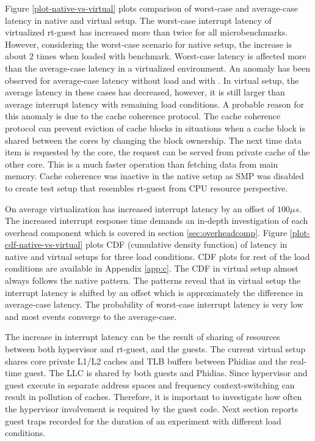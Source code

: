 


Figure \ref{plot-native-vs-virtual} plots comparison of worst-case and average-case latency in native and virtual setup.
The worst-case interrupt latency of virtualized rt-guest has increased more than twice for all microbenchmarks.
However, considering the worst-case scenario for native setup, the increase is about $2$ times when loaded with \mcachepressure{} benchmark.
Worst-case latency is affected more than the average-case latency in a virtualized environment.
An anomaly has been observed for average-case latency without load and with \mcachepressure{}. 
In virtual setup, the average latency in these cases has decreased, however, it is still larger than average interrupt latency with remaining load conditions.
A probable reason for this anomaly is due to the cache coherence protocol. 
The cache coherence protocol can prevent eviction of cache blocks in situations when a cache block is shared between the cores by changing the block ownership. The next time data item is requested by the core, the request can be served from private cache of the other core. This is a much faster operation than fetching data from main memory. Cache coherence was inactive in the native setup as SMP was disabled to create test setup that resembles rt-guest from CPU resource perspective.

On average virtualization has increased interrupt latency by an offset of $100\mu{}s$.
The increased interrupt response time demands an in-depth investigation of each overhead component which is covered in section \ref{sec:overheadcomp}.
Figure \ref{plot-cdf-native-vs-virtual} plots CDF (cumulative density function) of latency in native and virtual setups for three load conditions.
CDF plots for rest of the load conditions are available in Appendix \ref{app:c}.
The CDF in virtual setup almost always follows the native pattern.
The patterns reveal that in virtual setup the interrupt latency is shifted by an offset which is approximately the difference in average-case latency.
The probability of worst-case interrupt latency is very low and most events converge to the average-case.


The increase in interrupt latency can be the result of sharing of resources between both hypervisor and rt-guest, and the guests.
The current virtual setup shares core private L1/L2 caches and TLB buffers between Phidias and the real-time guest. 
The LLC is shared by both guests and Phidias.
Since hypervisor and guest execute in separate address spaces and frequency context-switching can result in pollution of caches.
Therefore, it is important to investigate how often the hypervisor involvement is required by the guest code.
Next section reports guest traps recorded for the duration of an experiment with different load conditions.

